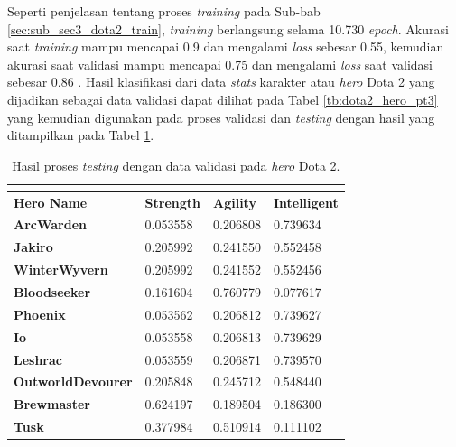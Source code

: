 Seperti penjelasan tentang proses \textit{training} pada Sub-bab \ref{sec:sub_sec3_dota2_train}, \textit{training} berlangsung selama 10.730 \textit{epoch}. Akurasi saat \textit{training} mampu mencapai 0.9 dan mengalami \textit{loss} sebesar 0.55, kemudian akurasi saat validasi mampu mencapai 0.75 dan mengalami \textit{loss} saat validasi sebesar 0.86 . Hasil klasifikasi dari data \textit{stats} karakter atau \textit{hero} Dota 2 yang dijadikan sebagai data validasi dapat dilihat pada Tabel \ref{tb:dota2_hero_pt3} yang kemudian digunakan pada proses validasi dan \textit{testing} dengan hasil yang ditampilkan pada Tabel \ref{tb:dota2_valid_result}.
\vspace{-2ex}

\begin{longtable}{|l|l|l|l|}
	\caption{Hasil proses \textit{testing} dengan data validasi pada \textit{hero} Dota 2.}
	\vspace{1ex}
	\label{tb:dota2_valid_result}\\
	\hline
	\rowcolor[HTML]{C0C0C0} 
	\textbf{Hero Name} & \textbf{Strength} & \textbf{Agility} & \textbf{Intelligent} \\ \hline
	\rowcolor[HTML]{FFFFFF} 
	\textbf{ArcWarden} & 0.053558 & 0.206808 & {\color[HTML]{FE0000} 0.739634} \\ \hline
	\rowcolor[HTML]{FFFFFF} 
	\textbf{Jakiro} & 0.205992 & 0.241550 & {\color[HTML]{036400} 0.552458} \\ \hline
	\rowcolor[HTML]{FFFFFF} 
	\textbf{WinterWyvern} & 0.205992 & 0.241552 & {\color[HTML]{036400} 0.552456} \\ \hline
	\rowcolor[HTML]{FFFFFF} 
	\textbf{Bloodseeker} & 0.161604 & {\color[HTML]{036400} 0.760779} & 0.077617 \\ \hline
	\rowcolor[HTML]{FFFFFF}
	\textbf{Phoenix} & 0.053562 & 0.206812 & {\color[HTML]{FE0000} 0.739627} \\ \hline
	\rowcolor[HTML]{FFFFFF} 
	\textbf{Io} & 0.053558 & 0.206813 & {\color[HTML]{FE0000} 0.739629} \\ \hline
	\rowcolor[HTML]{FFFFFF} 
	\textbf{Leshrac} & 0.053559 & 0.206871 & {\color[HTML]{036400} 0.739570} \\ \hline
	\rowcolor[HTML]{FFFFFF} 
	\textbf{OutworldDevourer} & 0.205848 & 0.245712 & {\color[HTML]{036400} 0.548440} \\ \hline
	\rowcolor[HTML]{FFFFFF} 
	\textbf{Brewmaster} & {\color[HTML]{036400} 0.624197} & 0.189504 & 0.186300 \\ \hline
	\rowcolor[HTML]{FFFFFF} 
	\textbf{Tusk} & 0.377984 & {\color[HTML]{FE0000} 0.510914} & 0.111102 \\ \hline

\end{longtable}
